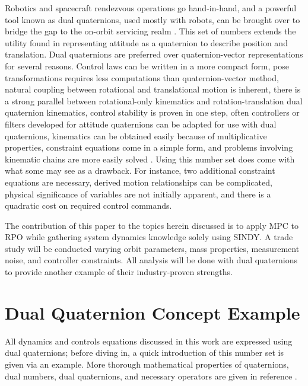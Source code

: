 \documentclass[letterpaper, preprint, paper,11pt]{AAS}	%
\begin{document}
Robotics and spacecraft rendezvous operations go hand-in-hand, and a powerful tool known as dual quaternions, used mostly with robots, can be brought over to bridge the gap to the on-orbit servicing realm \cite{valverde_tsiotras_spacecraftrobot}. This set of numbers extends the utility found in representing attitude as a quaternion to describe position and translation. Dual quaternions are preferred over quaternion-vector representations for several reasons. Control laws can be written in a more compact form, pose transformations requires less computations than quaternion-vector method, natural coupling between rotational and translational motion is inherent, there is a strong parallel between rotational-only kinematics and rotation-translation dual quaternion kinematics, control stability is proven in one step, often controllers or filters developed for attitude quaternions can be adapted for use with dual quaternions, kinematics can be obtained easily because of multiplicative properties, constraint equations come in a simple form, and problems involving kinematic chains are more easily solved \cite{filipe_tsiotras_dualQ,tsiotras_valverde_DualQuatAsTool,dooley_mccarthy_spatialrigidbody}. Using this number set does come with what some may see as a drawback. For instance, two additional constraint equations are necessary, derived motion relationships can be complicated, physical significance of variables are not initially apparent, and there is a quadratic cost on required control commands. \cite{dooley_mccarthy_spatialrigidbody,lee_mesbahi,constrainedautonomousprecision}


The contribution of this paper to the topics herein discussed is to apply MPC to RPO while gathering system dynamics knowledge solely using SINDY. A trade study will be conducted varying orbit parameters, mass properties, measurement noise, and controller constraints. All analysis will be done with dual quaternions to provide another example of their industry-proven strengths.

\section{Dual Quaternion Concept Example}
All dynamics and controls equations discussed in this work are expressed using dual quaternions; before diving in, a quick introduction of this number set is given via an example. More thorough mathematical properties of quaternions, dual numbers, dual quaternions, and necessary operators are given in reference . 
\end{document}
